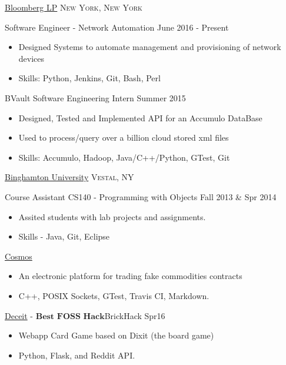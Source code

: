 \documentclass[11pt]{article}
\begin{document}
\headedsection  %
{\href{http://www.bloomberg.com/}{Bloomberg LP}}
{\textsc{New York, New York}}
{
    \headedsubsection
    {Software Engineer - Network Automation}
    {June 2016 - Present}
    {
        \begin{itemize}
            \item Designed Systems to automate management and provisioning of network devices
            \item Skills: Python, Jenkins, Git, Bash, Perl
        \end{itemize}
    }
}
\headedsection  %
{}
{} 
{
    \headedsubsection
    {BVault Software Engineering Intern}
    {Summer 2015}
    {
        \begin{itemize}
            \item Designed, Tested and Implemented API for an Accumulo DataBase
            \item Used to process/query over a billion cloud stored xml files
            \item Skills: Accumulo, Hadoop, Java/C++/Python, GTest, Git
        \end{itemize}
    }
}
\headedsection
{\href{}{Binghamton University}}
{\textsc{Vestal, NY}} {
    \headedsubsection
    {Course Assistant CS140 - Programming with Objects}
    {Fall 2013 \& Spr 2014}
    {
        \begin{itemize}
            \item Assited students with lab projects and assignments.
            \item Skills - Java, Git, Eclipse
        \end{itemize}
    }
}


\spacedhrule{0.1em}{0.5em}  %

\projects
{{\href{https://github.com/gabeochoa/Cosmos}{Cosmos}}}{}
{
    \begin{itemize}[label={}]
        \setlength\itemsep{.005ex}
        \item{An electronic platform for trading fake commodities contracts}
        \item{C++, POSIX Sockets, GTest, Travis CI, Markdown.}
    \end{itemize}
}

\projects
{{\href{https://github.com/gabeochoa/sokim}{Deceit}} - $\textbf{Best FOSS Hack}$}{BrickHack Spr16}
{
    \begin{itemize}[label={}]
        \setlength\itemsep{.005ex}
        \item{Webapp Card Game based on Dixit (the board game)}
        \item{Python, Flask, and Reddit API.}
    \end{itemize}
}
\end{document}
